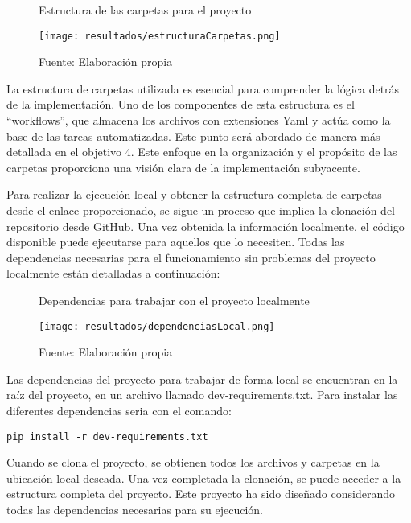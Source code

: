 \begin{figure}[h]
\centering
\caption{Estructura de las carpetas para el proyecto}
\texttt{[image: resultados/estructuraCarpetas.png]}
\caption*{\footnotesize Fuente: Elaboración propia}
\label{fig:figuraEstructuraCarpetas}
\end{figure}

La estructura de carpetas utilizada es esencial para comprender la lógica detrás de la implementación. Uno de los componentes de esta estructura es el ``workflows'', que almacena los archivos con extensiones Yaml y actúa como la base de las tareas automatizadas. Este punto será abordado de manera más detallada en el objetivo 4. Este enfoque en la organización y el propósito de las carpetas proporciona una visión clara de la implementación subyacente.

\newpage

Para realizar la ejecución local y obtener la estructura completa de carpetas desde el enlace proporcionado, se sigue un proceso que implica la clonación del repositorio desde GitHub. Una vez obtenida la información localmente, el código disponible puede ejecutarse para aquellos que lo necesiten. Todas las dependencias necesarias para el funcionamiento sin problemas del proyecto localmente están detalladas a continuación:


\begin{figure}[h]
\centering
\caption{Dependencias para trabajar con el proyecto localmente}
\texttt{[image: resultados/dependenciasLocal.png]}
\caption*{\footnotesize Fuente: Elaboración propia}
\label{fig:figuraDependenciasLocal}
\end{figure}

\newpage

Las dependencias del proyecto para trabajar de forma local se encuentran en la raíz del proyecto, en un archivo llamado dev-requirements.txt. Para instalar las diferentes dependencias seria con el comando: 
\begin{verbatim}
pip install -r dev-requirements.txt
\end{verbatim}

Cuando se clona el proyecto, se obtienen todos los archivos y carpetas en la ubicación local deseada. Una vez completada la clonación, se puede acceder a la estructura completa del proyecto. Este proyecto ha sido diseñado considerando todas las dependencias necesarias para su ejecución. \newline

